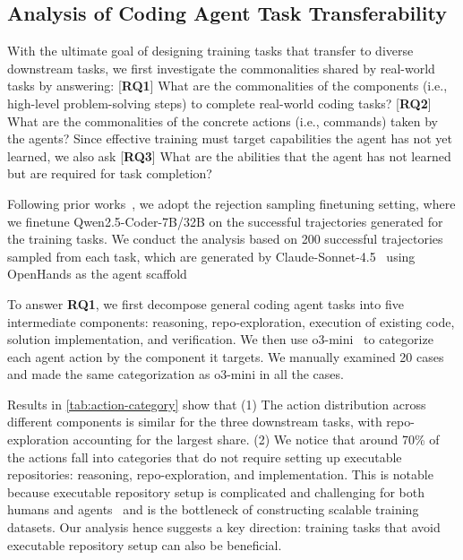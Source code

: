 \documentclass{article}
\theoremstyle{plain}
\theoremstyle{definition}
\theoremstyle{remark}
\begin{document}
\subsection{Analysis of Coding Agent Task Transferability}
\label{sec:analysis-methodology}
With the ultimate goal of designing training tasks that transfer to diverse downstream tasks, we first investigate the commonalities shared by real-world tasks by answering:
[\textbf{RQ1}] What are the commonalities of the components (i.e., high-level problem-solving steps) to complete real-world coding tasks?
[\textbf{RQ2}] What are the commonalities of the concrete actions (i.e., commands) taken by the agents?
Since effective training must target capabilities the agent has not yet learned, we also ask
[\textbf{RQ3}] What are the abilities that the agent has not learned but are required for task completion?

Following prior works~\citep{swegym,R2EGym,swe-play}, we adopt the rejection sampling finetuning setting, where we finetune Qwen2.5-Coder-7B/32B on the successful trajectories generated for the training tasks. 
We conduct the analysis based on 200 successful trajectories sampled from each task, which are generated by Claude-Sonnet-4.5~\cite{claude45} using OpenHands as the agent scaffold~\cite{openhands}


To answer \textbf{RQ1}, we first decompose general coding agent tasks into five intermediate components: reasoning, repo-exploration, execution of existing code, solution implementation, and verification. 
We then use o3-mini~\cite{o3_mini} to categorize each agent action by the component it targets.
We manually examined 20 cases and made the same categorization as o3-mini in all the cases.

Results in \autoref{tab:action-category} show that (1) The action distribution across different components is similar for the three downstream tasks, with repo-exploration accounting for the largest share.
(2) We notice that around 70\% of the actions fall into categories that do not require setting up executable repositories: reasoning, repo-exploration, and implementation.
This is notable because executable repository setup is complicated and challenging for both humans and agents~\cite{swe-smith,swe-play} and is the bottleneck of constructing scalable training datasets.
Our analysis hence suggests a key direction: training tasks that avoid executable repository setup can also be beneficial.
\end{document}

